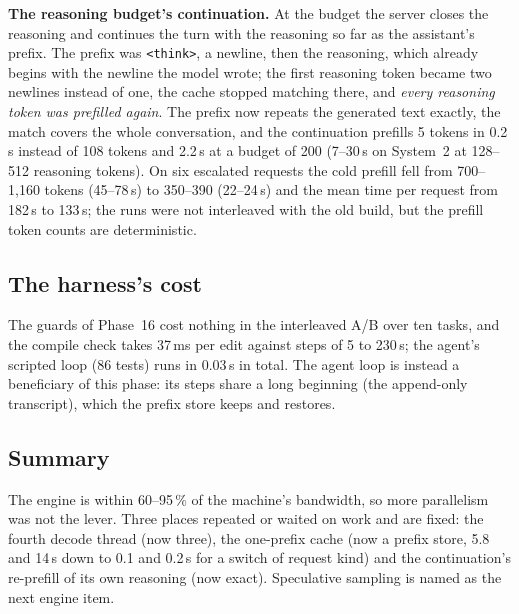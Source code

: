 \textbf{The reasoning budget's continuation.} At the budget the server closes the reasoning and continues the turn with the reasoning so far as the assistant's prefix. The
prefix was \texttt{<think>}, a newline, then the reasoning, which already begins with the newline the model wrote; the first reasoning token became two newlines
instead of one, the cache stopped matching there, and \emph{every reasoning token was prefilled again}. The prefix now repeats the generated text exactly, the
match covers the whole conversation, and the continuation prefills 5 tokens in 0.2\,s instead of 108 tokens and 2.2\,s at a budget of 200 (7--30\,s on System~2 at
128--512 reasoning tokens). On six escalated requests the cold prefill fell from 700--1,160 tokens (45--78\,s) to 350--390 (22--24\,s) and the mean time per request
from 182\,s to 133\,s; the runs were not interleaved with the old build, but the prefill token counts are deterministic.

\subsection{The harness's cost}

The guards of Phase~16 cost nothing in the interleaved A/B over ten tasks, and the compile check takes 37\,ms per edit against steps of 5 to 230\,s; the agent's scripted
loop (86 tests) runs in 0.03\,s in total. The agent loop is instead a beneficiary of this phase: its steps share a long beginning (the append-only transcript), which the
prefix store keeps and restores.

\subsection{Summary}

The engine is within 60--95\,\% of the machine's bandwidth, so more parallelism was not the lever. Three places repeated or waited on work and are fixed: the fourth
decode thread (now three), the one-prefix cache (now a prefix store, 5.8 and 14\,s down to 0.1 and 0.2\,s for a switch of request kind) and the continuation's re-prefill of its own
reasoning (now exact). Speculative sampling is named as the next engine item.
